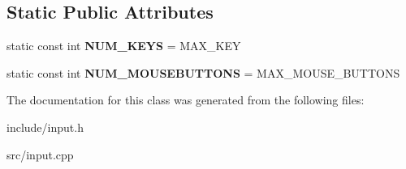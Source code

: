\subsection*{Static Public Attributes}
\begin{DoxyCompactItemize}
\item 
\hypertarget{class_z_e_g_l_1_1_input_a4acb5882b14a0e929faa42511fed5bb4}{}static const int {\bfseries N\+U\+M\+\_\+\+K\+E\+Y\+S} = M\+A\+X\+\_\+\+K\+E\+Y\label{class_z_e_g_l_1_1_input_a4acb5882b14a0e929faa42511fed5bb4}

\item 
\hypertarget{class_z_e_g_l_1_1_input_a1eb3e83ad6f2573297feac727b5b45f7}{}static const int {\bfseries N\+U\+M\+\_\+\+M\+O\+U\+S\+E\+B\+U\+T\+T\+O\+N\+S} = M\+A\+X\+\_\+\+M\+O\+U\+S\+E\+\_\+\+B\+U\+T\+T\+O\+N\+S\label{class_z_e_g_l_1_1_input_a1eb3e83ad6f2573297feac727b5b45f7}

\end{DoxyCompactItemize}


The documentation for this class was generated from the following files\+:\begin{DoxyCompactItemize}
\item 
include/input.\+h\item 
src/input.\+cpp\end{DoxyCompactItemize}
